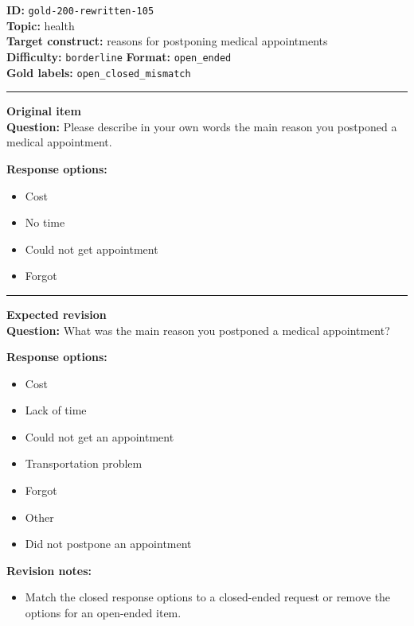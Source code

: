\documentclass[10pt,a4paper]{article}
\newcommand{\sectionline}{\vspace{0.15em}\hrule\vspace{0.35em}}
\begin{document}
\begin{tcolorbox}[colframe=FlawRed,colback=white,colbacktitle=FlawRed!9,coltitle=black,title={Item 105\hfill Flawed item}]
\textbf{ID:} \texttt{gold-200-rewritten-105}\\
\textbf{Topic:} health\\
\textbf{Target construct:} reasons for postponing medical appointments\\
\textbf{Difficulty:} \texttt{borderline} \quad \textbf{Format:} \texttt{open\_ended}\\
\textbf{Gold labels:} \texttt{open\_closed\_mismatch}\\
\sectionline
\textbf{Original item}\\
\textbf{Question:} Please describe in your own words the main reason you postponed a medical appointment.
\par\textbf{Response options:}
\begin{itemize}
\item Cost
\item No time
\item Could not get appointment
\item Forgot
\end{itemize}
\sectionline
\textbf{Expected revision}\\
\textbf{Question:} What was the main reason you postponed a medical appointment?
\par\textbf{Response options:}
\begin{itemize}
\item Cost
\item Lack of time
\item Could not get an appointment
\item Transportation problem
\item Forgot
\item Other
\item Did not postpone an appointment
\end{itemize}
\par\textbf{Revision notes:}
\begin{itemize}
\item Match the closed response options to a closed-ended request or remove the options for an open-ended item.
\end{itemize}
\end{tcolorbox}
\end{document}
